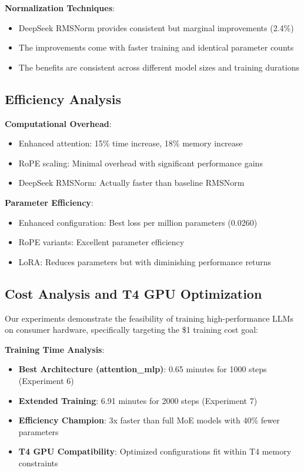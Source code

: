 \documentclass[11pt,a4paper]{article}
\begin{document}
\textbf{Normalization Techniques}:
\begin{itemize}
    \item DeepSeek RMSNorm provides consistent but marginal improvements (2.4\%)
    \item The improvements come with faster training and identical parameter counts
    \item The benefits are consistent across different model sizes and training durations
\end{itemize}

\subsection{Efficiency Analysis}

\textbf{Computational Overhead}:
\begin{itemize}
    \item Enhanced attention: 15\% time increase, 18\% memory increase
    \item RoPE scaling: Minimal overhead with significant performance gains
    \item DeepSeek RMSNorm: Actually faster than baseline RMSNorm
\end{itemize}

\textbf{Parameter Efficiency}:
\begin{itemize}
    \item Enhanced configuration: Best loss per million parameters (0.0260)
    \item RoPE variants: Excellent parameter efficiency
    \item LoRA: Reduces parameters but with diminishing performance returns
\end{itemize}

\subsection{Cost Analysis and T4 GPU Optimization}

Our experiments demonstrate the feasibility of training high-performance LLMs on consumer hardware, specifically targeting the \$1 training cost goal:

\textbf{Training Time Analysis}:
\begin{itemize}
    \item \textbf{Best Architecture (attention\_mlp)}: 0.65 minutes for 1000 steps (Experiment 6)
    \item \textbf{Extended Training}: 6.91 minutes for 2000 steps (Experiment 7)
    \item \textbf{Efficiency Champion}: 3x faster than full MoE models with 40\% fewer parameters
    \item \textbf{T4 GPU Compatibility}: Optimized configurations fit within T4 memory constraints
\end{itemize}
\end{document}
